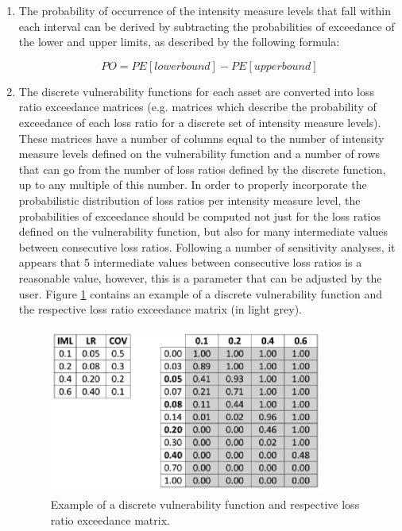 \begin{enumerate}
\item The probability of occurrence of the intensity measure levels that fall within each interval can be derived by subtracting the probabilities of exceedance of the lower and upper limits, as described by the following formula:

\begin{equation}
PO= PE[lower bound]-PE[upper bound]
\end{equation}

\item The discrete \glspl{vulnerability function} for each \gls{asset} are converted into loss ratio exceedance matrices (e.g. matrices which describe the probability of exceedance of each loss ratio for a discrete set of intensity measure levels). These matrices have a number of columns equal to the number of intensity measure levels defined on the \gls{vulnerability function} and a number of rows that can go from the number of loss ratios defined by the discrete function, up to any multiple of this number. In order to properly incorporate the probabilistic distribution of loss ratios per intensity measure level, the probabilities of exceedance should be computed not just for the loss ratios defined on the \gls{vulnerability function}, but also for many intermediate values between consecutive loss ratios. Following a number of sensitivity analyses, it appears that 5 intermediate values between consecutive loss ratios is a reasonable value, however, this is a parameter that can be adjusted by the user. Figure \ref{fig:LREM} contains an example of a discrete \gls{vulnerability function} and the respective loss ratio exceedance matrix (in light grey).

\begin{figure}[htb]
\centering
\includegraphics[width=9cm,height=5.5cm]{./figures/risk/LREM.eps}
\caption{Example of a discrete vulnerability function and respective loss ratio exceedance matrix.}
\label{fig:LREM}
\end{figure}


\end{enumerate}
